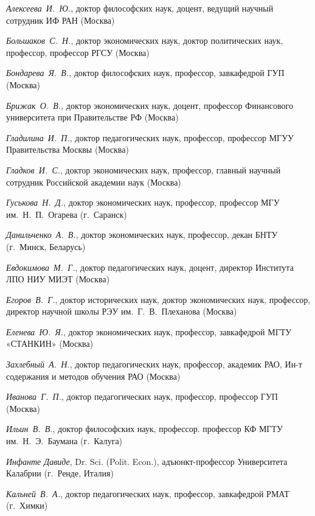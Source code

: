 \begin{multicols}{2}
\begin{flushleft}
    \noindent \textit{Алексеева И. Ю.}, доктор философских наук, доцент, ведущий научный сотрудник ИФ РАН (Москва)
    
    \noindent \textit{Большаков С. Н.}, доктор экономических наук, доктор политических наук, профессор, профессор РГСУ (Москва)
    
    \noindent \textit{Бондарева Я. В.}, доктор философских наук, профессор, завкафедрой ГУП (Москва)


    \noindent \textit{Брижак О. В.}, доктор экономических наук, доцент, профессор Финансового университета при Правительстве РФ (Москва)
    
    \noindent \textit{Гладилина И. П.}, доктор педагогических наук, профессор, профессор МГУУ Правительства Москвы (Москва)
    
    \noindent \textit{Гладков И. С.}, доктор экономических наук, профессор, главный научный сотрудник Российской академии наук (Москва)
    
    \noindent \textit{Гуськова Н. Д.}, доктор экономических наук, профессор, профессор МГУ им. Н. П. Огарева (г. Саранск)
    
    \noindent \textit{Данильченко А. В.}, доктор экономических наук, профессор, декан БНТУ (г. Минск, Беларусь)
    
    \noindent \textit{Евдокимова М. Г.}, доктор педагогических наук, доцент, директор Института ЛПО НИУ МИЭТ (Москва)
    
    \noindent \textit{Егоров В. Г.}, доктор исторических наук, доктор экономических наук, профессор, директор научной школы РЭУ им. Г. В. Плеханова (Москва)
   
    \noindent \textit{Еленева Ю. Я.}, доктор экономических наук, профессор, завкафедрой МГТУ «СТАНКИН» (Москва)
    
    \noindent \textit{Захлебный А. Н.}, доктор педагогических наук, профессор, академик РАО, Ин-т содержания и методов обучения РАО (Москва)
    
    \noindent \textit{Иванова Г. П.}, доктор педагогических наук, профессор, профессор ГУП (Москва)
    
    \noindent \textit{Ильин В. В.}, доктор философских наук, профессор. профессор КФ МГТУ им. Н. Э. Баумана (г. Калуга)
    
    \noindent \textit{Инфанте Давиде}, Dr. Sci. (Polit. Econ.), адъюнкт-профессор Университета Калабрии (г. Ренде, Италия)
    
    \noindent \textit{Кальней В. А.}, доктор педагогических наук, профессор, завкафедрой РМАТ (г. Химки)
    

\end{flushleft}
\end{multicols}
